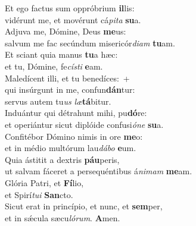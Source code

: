 \evenverse Et ego factus sum oppróbrium \textbf{il}lis:~\*\\
\evenverse vidérunt me, et movérunt cá\textit{pi}\textit{ta} \textbf{su}a.\\
\oddverse Adjuva me, Dómine, Deus \textbf{me}us:~\*\\
\oddverse salvum me fac secúndum misericór\textit{di}\textit{am} \textbf{tu}am.\\
\evenverse Et sciant quia manus \textbf{tu}a hæc:~\*\\
\evenverse et tu, Dómine, fe\textit{cí}\textit{sti} \textbf{e}am.\\
\oddverse Maledícent illi, et tu benedíces:~+\\
\oddverse  qui insúrgunt in me, confun\textbf{dán}tur:~\*\\
\oddverse servus autem tu\textit{us} \textit{læ}\textbf{tá}bitur.\\
\evenverse Induántur qui détrahunt mihi, pu\textbf{dó}re:~\*\\
\evenverse et operiántur sicut diplóide confusi\textit{ó}\textit{ne} \textbf{su}a.\\
\oddverse Confitébor Dómino nimis in ore \textbf{me}o:~\*\\
\oddverse et in médio multórum lau\textit{dá}\textit{bo} \textbf{e}um.\\
\evenverse Quia ástitit a dextris \textbf{páu}peris,~\*\\
\evenverse ut salvam fáceret a persequéntibus á\textit{ni}\textit{mam} \textbf{me}am.\\
\oddverse Glória Patri, et \textbf{Fí}lio,~\*\\
\oddverse et Spirí\textit{tu}\textit{i} \textbf{San}cto.\\
\evenverse Sicut erat in princípio, et nunc, et \textbf{sem}per,~\*\\
\evenverse et in sǽcula sæcu\textit{ló}\textit{rum}. \textbf{A}men.\\
